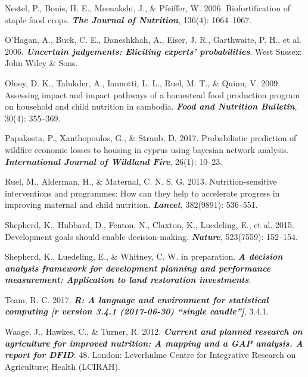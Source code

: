 \documentclass[
]{article}
\newlength{\cslhangindent}
\newlength{\cslentryspacingunit} %
\newenvironment{CSLReferences}[2] %
 {%
  \setlength{\parindent}{0pt}
  \ifodd #1
  \let\oldpar\par
  \def\par{\hangindent=\cslhangindent\oldpar}
  \fi
  \setlength{\parskip}{#2\cslentryspacingunit}
 }%
 {}
\begin{document}
\begin{CSLReferences}{1}{0}
\leavevmode{}%
Nestel, P., Bouis, H. E., Meenakshi, J., \& Pfeiffer, W. 2006.
Biofortification of staple food crops. \textbf{\emph{The Journal of
Nutrition}}, 136(4): 1064--1067.

\leavevmode{}%
O'Hagan, A., Buck, C. E., Daneshkhah, A., Eiser, J. R., Garthwaite, P.
H., et al. 2006. \textbf{\emph{Uncertain judgements: Eliciting experts'
probabilities}}. West Sussex: John Wiley \& Sons.

\leavevmode{}%
Olney, D. K., Talukder, A., Iannotti, L. L., Ruel, M. T., \& Quinn, V.
2009. Assessing impact and impact pathways of a homestead food
production program on household and child nutrition in cambodia.
\textbf{\emph{Food and Nutrition Bulletin}}, 30(4): 355--369.

\leavevmode{}%
Papakosta, P., Xanthopoulos, G., \& Straub, D. 2017. Probabilistic
prediction of wildfire economic losses to housing in cyprus using
bayesian network analysis. \textbf{\emph{International Journal of
Wildland Fire}}, 26(1): 10--23.

\leavevmode{}%
Ruel, M., Alderman, H., \& Maternal, C. N. S. G. 2013.
Nutrition-sensitive interventions and programmes: How can they help to
accelerate progress in improving maternal and child nutrition.
\textbf{\emph{Lancet}}, 382(9891): 536--551.

\leavevmode{}%
Shepherd, K., Hubbard, D., Fenton, N., Claxton, K., Luedeling, E., et
al. 2015. Development goals should enable decision-making.
\textbf{\emph{Nature}}, 523(7559): 152--154.

\leavevmode{}%
Shepherd, K., Luedeling, E., \& Whitney, C. W. in preparation.
\textbf{\emph{A decision analysis framework for development planning and
performance measurement: Application to land restoration investments}}.

\leavevmode{}%
Team, R. C. 2017. \textbf{\emph{R: A language and environment for
statistical computing {[}r version 3.4.1 (2017-06-30) {``single
candle''}{]}}}, 3.4.1.

\leavevmode{}%
Waage, J., Hawkes, C., \& Turner, R. 2012. \textbf{\emph{Current and
planned research on agriculture for improved nutrition: A mapping and a
GAP analysis. A report for DFID}}: 48. London: Leverhulme Centre for
Integrative Research on Agriculture; Health (LCIRAH).


\end{CSLReferences}
\end{document}
